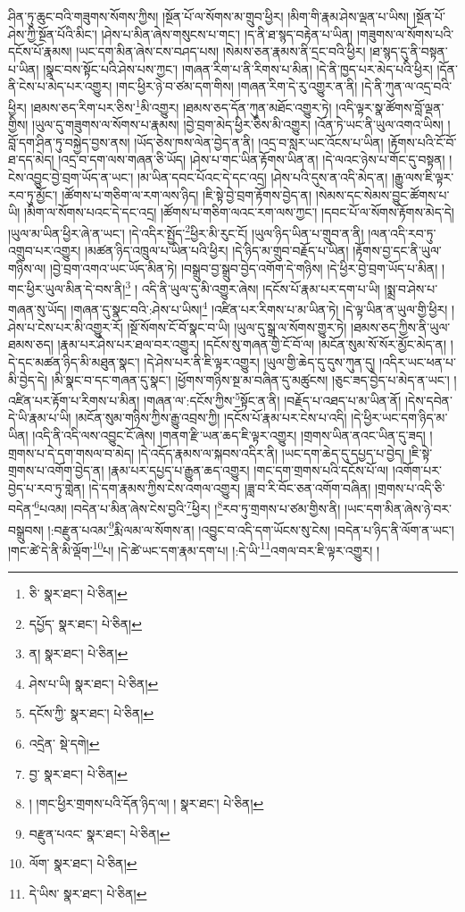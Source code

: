 ཤིན་ཏུ་ཆུང་བའི་གཟུགས་སོགས་ཀྱིས། །སྔོན་པོ་ལ་སོགས་མ་གྲུབ་ཕྱིར། །མིག་གི་རྣམ་ཤེས་ལྡན་པ་ཡིས། །སྔོན་པོ་ཤེས་ཀྱི་སྔོན་པོའི་མིང་། །ཤེས་པ་མིན་ཞེས་གསུངས་པ་གང་། །ད་ནི་ཐ་སྙད་བརྟེན་པ་ཡིན། །གཟུགས་ལ་སོགས་པའི་དངོས་པོ་རྣམས། །ཡང་དག་མིན་ཞེས་ངས་བཤད་པས། །སེམས་ཅན་རྣམས་ནི་དྲང་བའི་ཕྱིར། །ཐ་སྙད་དུ་ནི་བསྟན་པ་ཡིན། །སྣང་བས་སྟོང་པའི་ཤེས་པས་ཀྱང་། །གཞན་རིག་པ་ནི་རིགས་པ་མིན། །དེ་ནི་ཁྱད་པར་མེད་པའི་ཕྱིར། །དོན་ནི་ངེས་པ་མེད་པར་འགྱུར། །གང་ཕྱིར་ཉེ་བ་ཙམ་དག་གིས། །གཞན་རིག་དེ་རུ་འགྱུར་ན་ནི། །དེ་ནི་ཀུན་ལ་འདྲ་བའི་ཕྱིར། །ཐམས་ཅད་རིག་པར་ཅིས་\footnote{ཅི་  སྣར་ཐང་།  པེ་ཅིན། }མི་འགྱུར། །ཐམས་ཅད་དོན་ཀུན་མཐོང་འགྱུར་ཏེ། །འདི་ལྟར་སྣ་ཚོགས་བློ་ལྡན་གྱིས། །ཡུལ་དུ་གཟུགས་ལ་སོགས་པ་རྣམས། །བྱེ་བྲག་མེད་ཕྱིར་ཅིས་མི་འགྱུར། །འོན་ཏེ་ཡང་ནི་ཡུལ་འགའ་ཡིས། །བློ་དག་ཤིན་ཏུ་བསྐྱེད་བྱས་ནས། །ཡོད་ཅེས་ཁས་ལེན་བྱེད་ན་ནི། །འདྲ་བ་སླར་ཡང་འོངས་པ་ཡིན། །རྟོགས་པའི་ངོ་བོ་ཐ་དད་མེད། །འདྲ་བ་དག་ལས་གཞན་ཅི་ཡོད། །ཤེས་པ་གང་ཡིན་རྟོགས་ཡིན་ན། །དེ་ལའང་ཉེས་པ་གོང་དུ་བསྟན། །ངེས་འབྱུང་བྱེ་བྲག་ཡོད་ན་ཡང་། །མ་ཡིན་དབང་པོའང་དེ་དང་འདྲ། །ཤེས་པའི་དུས་ན་འདི་མེད་ན། །རྒྱུ་ལས་ཇི་ལྟར་རབ་ཏུ་མྱོང་། །ཚོགས་པ་གཅིག་ལ་རག་ལས་ཉིད། །ཇི་སྟེ་བྱེ་བྲག་རྟོགས་བྱེད་ན། །སེམས་དང་སེམས་བྱུང་ཚོགས་པ་ཡི། །མིག་ལ་སོགས་པའང་དེ་དང་འདྲ། །ཚོགས་པ་གཅིག་ལའང་རག་ལས་ཀྱང་། །དབང་པོ་ལ་སོགས་རྟོགས་མེད་དེ། །ཡུལ་མ་ཡིན་ཕྱིར་ཞེ་ན་ཡང་། །དེ་འདིར་སྤྱོད་\footnote{དཔྱོད་  སྣར་ཐང་།  པེ་ཅིན། }ཕྱིར་མི་རུང་ངོ། །ཡུལ་ཉིད་ཡིན་པ་གྲུབ་ན་ནི། །ལན་འདི་རབ་ཏུ་འགྲུབ་པར་འགྱུར། །མཚན་ཉིད་འཁྲུལ་པ་ཡིན་པའི་ཕྱིར། །དེ་ཉིད་མ་གྲུབ་བརྗོད་པ་ཡིན། །རྟོགས་བྱ་དང་ནི་ཡུལ་གཉིས་ལ། །བྱེ་བྲག་འགའ་ཡང་ཡོད་མིན་ཏེ། །བསྒྲུབ་བྱ་སྒྲུབ་བྱེད་འགོག་དེ་གཉིས། །དེ་ཕྱིར་བྱེ་བྲག་ཡོད་པ་མིན། །གང་ཕྱིར་ཡུལ་མིན་དེ་བས་ནི།\footnote{ན།  སྣར་ཐང་།  པེ་ཅིན། } །
འདི་ནི་ཡུལ་དུ་མི་འགྱུར་ཞེས། །དངོས་པོ་རྣམ་པར་དག་པ་ཡི། །སྨྲ་བ་ཤེས་པ་གཞན་སུ་ཡོད། །གཞན་དུ་སྣང་བའི་:ཤེས་པ་ཡིས།\footnote{ཤེས་པ་ཡི།  སྣར་ཐང་།  པེ་ཅིན། } །འཛིན་པར་རིགས་པ་མ་ཡིན་ཏེ། །དེ་ལྟ་ཡིན་ན་ཡུལ་གྱི་ཕྱིར། །ཤེས་པ་ངེས་པར་མི་འགྱུར་རོ། །སྔོ་སོགས་ངོ་བོ་སྣང་བ་ཡི། །ཡུལ་དུ་སྒྲ་ལ་སོགས་གྱུར་ཏེ། །ཐམས་ཅད་ཀྱིས་ནི་ཡུལ་ཐམས་ཅད། །རྣམ་པར་ཤེས་པར་ཐལ་བར་འགྱུར། །དངོས་སུ་གཞན་གྱི་ངོ་བོ་ལ། །མངོན་སུམ་སོ་སོར་མྱོང་མེད་ན། །དེ་དང་མཚན་ཉིད་མི་མཐུན་སྣང་། །དེ་ཤེས་པར་ནི་ཇི་ལྟར་འགྱུར། །ཡུལ་གྱི་ཆེད་དུ་དུས་ཀུན་དུ། །འདིར་ཡང་ཕན་པ་མི་བྱེད་དེ། །མི་སྣང་བ་དང་གཞན་དུ་སྣང་། །ཕྱོགས་གཉིས་སྔ་མ་བཞིན་དུ་མཚུངས། །ཅུང་ཟད་བྱེད་པ་མེད་ན་ཡང་། །འཛིན་པར་རྟོག་པ་རིགས་པ་མིན། །གཞན་ལ་:དངོས་ཀྱིས་\footnote{དངོས་ཀྱི་  སྣར་ཐང་།  པེ་ཅིན། }སྟོང་ན་ནི། །བརྗོད་པ་འཐད་པ་མ་ཡིན་ནོ། །དེས་དབེན་དེ་ཡི་རྣམ་པ་ཡི། །མངོན་སུམ་གཉིས་ཀྱིས་རྒྱུ་འབྲས་ཀྱི། །དངོས་པོ་རྣམ་པར་ངེས་པ་འདི། །དེ་ཕྱིར་ཡང་དག་ཉིད་མ་ཡིན། །འདི་ནི་འདི་ལས་འབྱུང་ངོ་ཞེས། །གནག་རྫི་ཡན་ཆད་ཇི་ལྟར་འགྱུར། །གྲགས་ཡིན་ནའང་ཡིན་དུ་ཟད། །གྲགས་པ་དེ་དག་གསལ་བ་མེད། །དེ་འདོད་རྣམས་ལ་སྐབས་འདིར་ནི། །ཡང་དག་ཆེད་དུ་དཔྱད་པ་བྱེད། །ཇི་སྟེ་གྲགས་པ་འགོག་བྱེད་ན། །རྣམ་པར་དཔྱད་པ་རྒྱུན་ཆད་འགྱུར། །གང་དག་གྲགས་པའི་དངོས་པོ་ལ། །འགོག་པར་བྱེད་པ་རབ་ཏུ་གླེན། །དེ་དག་རྣམས་ཀྱིས་ངེས་འགལ་འགྱུར། །ཟླ་བ་རི་བོང་ཅན་འགོག་བཞིན། །གྲགས་པ་འདི་ཅི་བདེན་\footnote{འདྲེན་  སྡེ་དགེ། }པའམ། །བདེན་པ་མིན་ཞེས་ངེས་བྱའི་\footnote{བྱ་  སྣར་ཐང་།  པེ་ཅིན། }ཕྱིར། །\footnote{། །གང་ཕྱིར་གྲགས་པའི་དོན་ཉིད་ལ། །  སྣར་ཐང་།  པེ་ཅིན། }རབ་ཏུ་གྲགས་པ་ཙམ་གྱིས་ནི། །ཡང་དག་མིན་ཞེས་ཉེ་བར་བསྒྲུབས། །:བརྫུན་པའམ་\footnote{བརྫུན་པའང་  སྣར་ཐང་།  པེ་ཅིན། }རྨི་ལམ་ལ་སོགས་ན། །འབྱུང་བ་འདི་དག་ཡོངས་སུ་ངེས། །བདེན་པ་ཉིད་ནི་ལོག་ན་ཡང་། །གང་ཚེ་དེ་ནི་མི་ལྡོག་\footnote{ལོག་  སྣར་ཐང་།  པེ་ཅིན། }པ། །དེ་ཚེ་ཡང་དག་རྣམ་དག་པ། །:དེ་ཡི་\footnote{དེ་ཡིས་  སྣར་ཐང་།  པེ་ཅིན། }འགལ་བར་ཇི་ལྟར་འགྱུར། །
